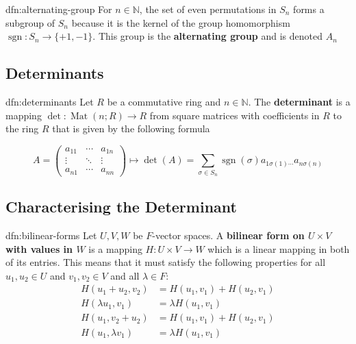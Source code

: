 \documentclass[landscape, 8pt]{extarticle}
\DeclareMathOperator{\sgn}{sgn}
\DeclareMathOperator{\Mat}{Mat}
\begin{document}
\begin{multicols}{3}
\begin{dfn}{dfn:alternating-group}{}
    For $n\in \mathbb{N}$, the set of even permutations in $S_{n}$ forms a subgroup of $S_{n}$ because it is the kernel of the group homomorphism $\sgn : S_{n}\to \{+1, -1\}$. This group is the \textbf{alternating group} and is denoted $A_{n}$
\end{dfn}

\subsection{Determinants}

\begin{dfn}[Determinants]{dfn:determinants}{}
    Let $R$ be a commutative ring and $n\in \mathbb{N}$. The \textbf{determinant} is a mapping $\det : \Mat(n;R) \to R$ from square matrices with coefficients in $R$ to the ring $R$ that is given by the following formula

    \[A = \begin{pmatrix}
        a_{11} & \cdots & a_{1n}\\
        \vdots & \ddots & \vdots\\
        a_{n1} & \cdots & a_{nn}
    \end{pmatrix} \mapsto \det(A) = \sum_{\sigma\in S_{n}} \sgn(\sigma) a_{1\sigma(1)\cdots}  a_{n\sigma(n)}\]
\end{dfn}

\subsection{Characterising the Determinant}

\begin{dfn}{dfn:bilinear-forms}{}
    Let $U,V,W$ be $F$-vector spaces. A \textbf{bilinear form on $U \times V$ with values in $W$} is a mapping $H: U \times V \to W $ which is a linear mapping in both of its entries. This means that it must satisfy the following properties for all $u_{1}, u_{2}\in U$ and $v_{1}, v_{2}\in V$ and all $\lambda\in F$:
    \begin{align*}
        H(u_{1} + u_{2}, v_{2}) &= H(u_{1}, v_{1}) + H(u_{2}, v_{1})\\
        H(\lambda u_{1}, v_{1}) &= \lambda H(u_{1}, v_{1}) \\
        H(u_{1}, v_{2} + u_{2}) &= H(u_{1}, v_{1}) + H(u_{2}, v_{1})\\
        H(u_{1},\lambda v_{1}) &= \lambda H(u_{1}, v_{1}) \\
    \end{align*}
\end{dfn}


\end{multicols}
\end{document}
